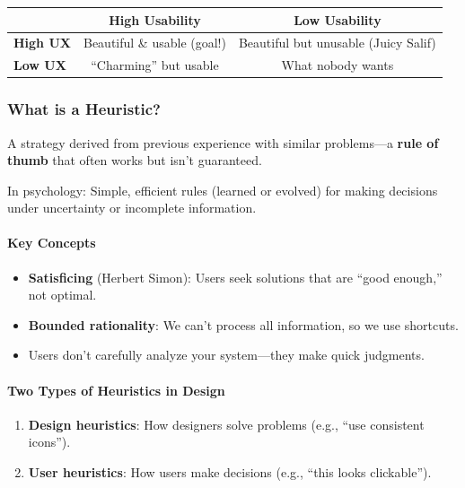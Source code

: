 \begin{center}
\renewcommand{\arraystretch}{1.3}
\begin{tabular}{@{} l | c c @{}}
& \textbf{High Usability} & \textbf{Low Usability} \\
\midrule
\textbf{High UX} & Beautiful \& usable (goal!) & Beautiful but unusable (Juicy Salif) \\
\textbf{Low UX} & ``Charming'' but usable & What nobody wants \\
\end{tabular}
\end{center}

\subsubsection*{What is a Heuristic?}

\begin{defbox}[Heuristic]
A strategy derived from previous experience with similar problems---a \textbf{rule of thumb} that often works but isn't guaranteed.

In psychology: Simple, efficient rules (learned or evolved) for making decisions under uncertainty or incomplete information.
\end{defbox}

\paragraph*{Key Concepts}
\begin{itemize}
  \item \textbf{Satisficing} (Herbert Simon): Users seek solutions that are ``good enough,'' not optimal.
  \item \textbf{Bounded rationality}: We can't process all information, so we use shortcuts.
  \item Users don't carefully analyze your system---they make quick judgments.
\end{itemize}

\paragraph*{Two Types of Heuristics in Design}
\begin{enumerate}
  \item \textbf{Design heuristics}: How designers solve problems (e.g., ``use consistent icons'').
  \item \textbf{User heuristics}: How users make decisions (e.g., ``this looks clickable'').
\end{enumerate}

